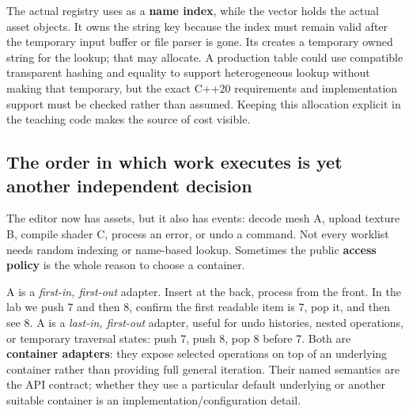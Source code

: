 The actual registry uses  as a \textbf{name index}, while the vector holds the actual asset objects. It owns the string key because the index must remain valid after the temporary input buffer or file parser is gone. Its  creates a temporary owned string for the lookup; that may allocate. A production table could use compatible transparent hashing and equality to support heterogeneous lookup without making that temporary, but the exact C++20 requirements and implementation support must be checked rather than assumed. Keeping this allocation explicit in the teaching code makes the source of cost visible.

\subsection{The order in which work executes is yet another independent decision}\label{01-foundations-i-ch006-the-order-in-which-work-executes-is-yet-another-independent-decision}

\hypertarget{01-foundations-i-ch006-the-order-in-which-work-executes-is-yet-another-independent-decision}{}

The editor now has assets, but it also has events: decode mesh A, upload texture B, compile shader C, process an error, or undo a command. Not every worklist needs random indexing or name-based lookup. Sometimes the public \textbf{access policy} is the whole reason to choose a container.

A  is a \emph{first-in, first-out} adapter. Insert at the back, process from the front. In the lab we push 7 and then 8, confirm the first readable item is 7, pop it, and then see 8. A  is a \emph{last-in, first-out} adapter, useful for undo histories, nested operations, or temporary traversal states: push 7, push 8, pop 8 before 7. Both are \textbf{container adapters}: they expose selected operations on top of an underlying container rather than providing full general iteration. Their named semantics are the API contract; whether they use a particular default underlying  or another suitable container is an implementation/configuration detail.

